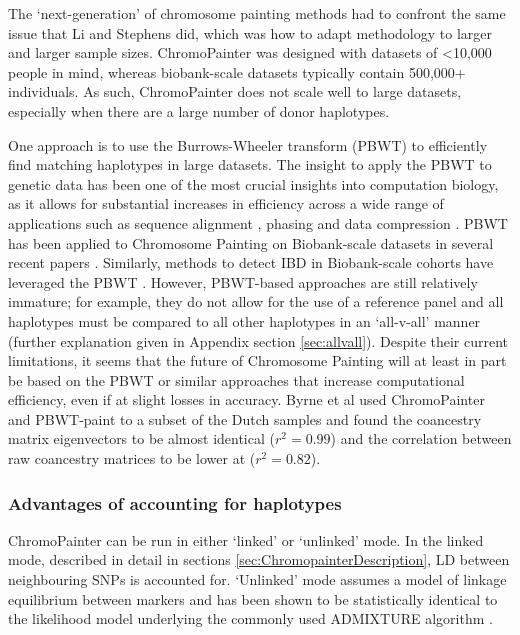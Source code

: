The `next-generation' of chromosome painting methods had to confront the same issue that Li and Stephens did, which was how to adapt methodology to larger and larger sample sizes. ChromoPainter was designed with datasets of <10,000 people in mind, whereas biobank-scale datasets typically contain 500,000+ individuals. As such, ChromoPainter does not scale well to large datasets, especially when there are a large number of donor haplotypes. 

One approach is to use the Burrows-Wheeler transform (PBWT) \cite{burrows1994block, DurbinPBWT} to efficiently find matching haplotypes in large datasets. The insight to apply the PBWT to genetic data has been one of the most crucial insights into computation biology, as it allows for substantial increases in efficiency across a wide range of applications such as sequence alignment \cite{LiBWA}, phasing \cite{delaneau2018integrative} and data compression \cite{naseri2019multi}. PBWT has been applied to Chromosome Painting on Biobank-scale datasets in several recent papers \cite{byrne2020dutch, saada2020identity}. Similarly, methods to detect IBD in Biobank-scale cohorts have leveraged the PBWT \cite{naseri2019rapid, zhou2020fast}. However, PBWT-based approaches are still relatively immature; for example, they do not allow for the use of a reference panel and all haplotypes must be compared to all other haplotypes in an `all-v-all' manner (further explanation given in Appendix section \ref{sec:allvall}). Despite their current limitations, it seems that the future of Chromosome Painting will at least in part be based on the PBWT or similar approaches that increase computational efficiency, even if at slight losses in accuracy. Byrne et al used ChromoPainter and PBWT-paint to a subset of the Dutch samples and found the coancestry matrix eigenvectors to be almost identical ($r^2 = 0.99$) and the correlation between raw coancestry matrices to be lower at ($r^2 = 0.82$).

\subsubsection{Advantages of accounting for haplotypes}

ChromoPainter can be run in either `linked' or `unlinked' mode. In the linked mode, described in detail in sections \ref{sec:ChromopainterDescription}, LD between neighbouring SNPs is accounted for. `Unlinked' mode assumes a model of linkage equilibrium between markers and has been shown to be statistically identical to the likelihood model underlying the commonly used ADMIXTURE algorithm \cite{Lawson2012}.

